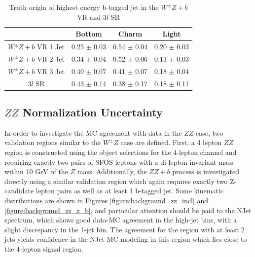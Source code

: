 \begin{table}[htbp]
\centering 
\begin{tabular}{|c|c|c|c|} 
  \hline
  & Bottom  & Charm & Light \\
  \hline
  $W^{\pm}Z+b$ VR 1 Jet& 0.25 $\pm$ 0.03 & 0.54  $\pm$ 0.04 & 0.20 $\pm$ 0.03 \\ 
  $W^{\pm}Z+b$ VR 2 Jet& 0.34 $\pm$ 0.04 & 0.52  $\pm$ 0.06 & 0.13 $\pm$ 0.03 \\ 
  $W^{\pm}Z+b$ VR 3 Jet& 0.40 $\pm$ 0.07 & 0.41  $\pm$ 0.07 & 0.18 $\pm$ 0.04 \\
  3$l$ SR              & 0.43 $\pm$ 0.14 & 0.38  $\pm$ 0.17 & 0.18 $\pm$ 0.11 \\
  \hline 
\end{tabular}
\caption{Truth origin of highest energy b-tagged jet in the $W^{\pm}Z+b$ VR and 3$l$ SR} 
\label{table:wz_truth}
\end{table} 

\subsection{$ZZ$ Normalization Uncertainty}

In order to investigate the MC agreement with data in the $ZZ$ case, two validation regions similar to the $W^{\pm}Z$ case are defined. First, a 4 lepton $ZZ$ region is constructed using the object selections for the 4-lepton channel and requiring exactly two pairs of 
SFOS leptons with a di-lepton invariant mass within 10 GeV of the $Z$ mass. Additionally, the $ZZ+b$ process 
is investigated directly using a similar validation region which again requires exactly two Z-candidate lepton pairs as well as at least 1 b-tagged jet. Some kinematic distributions are shown in Figures \ref{figure:background_zz_incl} and \ref{figure:background_zz_z_b}, and particular attention should be paid to the NJet spectrum, which shows good data-MC agreement in the high-jet bins, with a slight discrepancy in the 1-jet bin. The agreement for the region with at least 2 jets yields confidence in the NJet MC modeling in this region which lies close to the 4-lepton signal region. 

